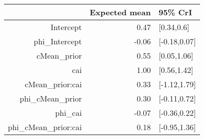 \begin{tabular}{rrl}
  \hline
 & Expected mean & 95\% CrI \\ 
  \hline
Intercept & 0.47 & [0.34,0.6] \\ 
  phi\_Intercept & -0.06 & [-0.18,0.07] \\ 
  cMean\_prior & 0.55 & [0.05,1.06] \\ 
  cai & 1.00 & [0.56,1.42] \\ 
  cMean\_prior:cai & 0.33 & [-1.12,1.79] \\ 
  phi\_cMean\_prior & 0.30 & [-0.11,0.72] \\ 
  phi\_cai & -0.07 & [-0.36,0.22] \\ 
  phi\_cMean\_prior:cai & 0.18 & [-0.95,1.36] \\ 
   \hline
\end{tabular}

